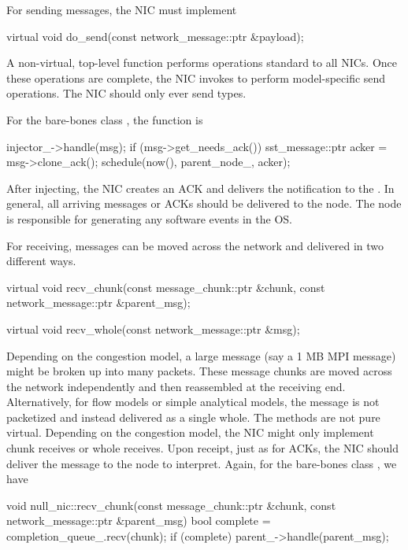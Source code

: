 For sending messages, the NIC must implement

\begin{CppCode}
  virtual void
  do_send(const network_message::ptr &payload);
\end{CppCode}
A non-virtual, top-level  function performs operations standard to all NICs.
Once these operations are complete, the NIC invokes  to perform model-specific send operations.
The NIC should only ever send  types.

For the bare-bones class , the function is

\begin{CppCode}
  injector_->handle(msg);
  if (msg->get_needs_ack()) {
    sst_message::ptr acker = msg->clone_ack();
    schedule(now(), parent_node_, acker);
  }
\end{CppCode}
After injecting, the NIC creates an ACK and delivers the notification to the \nodecls.
In general, all arriving messages or ACKs should be delivered to the node.
The node is responsible for generating any software events in the OS.

For receiving, messages can be moved across the network and delivered in two different ways.

\begin{CppCode}
  virtual void
  recv_chunk(const message_chunk::ptr &chunk,
             const network_message::ptr &parent_msg);

  virtual void
  recv_whole(const network_message::ptr &msg);
\end{CppCode}

Depending on the congestion model, a large message (say a 1 MB MPI message) might be broken up into many packets.
These message chunks are moved across the network independently and then reassembled at the receiving end.
Alternatively, for flow models or simple analytical models, the message is not packetized and instead delivered as a single whole.
The methods are not pure virtual.  Depending on the congestion model,  the NIC might only implement chunk receives or whole receives.
Upon receipt, just as for ACKs, the NIC should deliver the message to the node to interpret.
Again, for the bare-bones class , we have

\begin{CppCode}
void
null_nic::recv_chunk(const message_chunk::ptr &chunk,
                     const network_message::ptr &parent_msg)
{
  bool complete = completion_queue_.recv(chunk);
  if (complete){
    parent_->handle(parent_msg);
  }
}
\end{CppCode}


